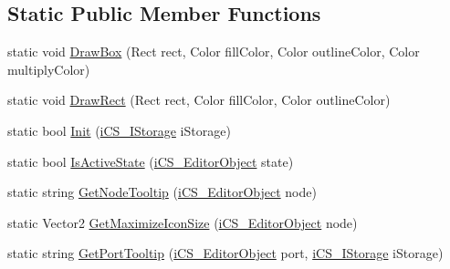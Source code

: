 \subsection*{Static Public Member Functions}
\begin{DoxyCompactItemize}
\item 
static void \hyperlink{classi_c_s___graphics_adc3ae4c2c48f361a59959bd2bf81a604}{Draw\+Box} (Rect rect, Color fill\+Color, Color outline\+Color, Color multiply\+Color)
\item 
static void \hyperlink{classi_c_s___graphics_a691d3ea8d4bfbca7bc6bc3f5eef1a66c}{Draw\+Rect} (Rect rect, Color fill\+Color, Color outline\+Color)
\item 
static bool \hyperlink{classi_c_s___graphics_a87c9c03e96791a61ce69958a7abff6f2}{Init} (\hyperlink{classi_c_s___i_storage}{i\+C\+S\+\_\+\+I\+Storage} i\+Storage)
\item 
static bool \hyperlink{classi_c_s___graphics_ad79270a927c0b998257c2476ebfac346}{Is\+Active\+State} (\hyperlink{classi_c_s___editor_object}{i\+C\+S\+\_\+\+Editor\+Object} state)
\item 
static string \hyperlink{classi_c_s___graphics_a49ee3ede903f1a790e4c24f33d2f58dc}{Get\+Node\+Tooltip} (\hyperlink{classi_c_s___editor_object}{i\+C\+S\+\_\+\+Editor\+Object} node)
\item 
static Vector2 \hyperlink{classi_c_s___graphics_a28eb25eee213fbd3bfcb82766bc1a074}{Get\+Maximize\+Icon\+Size} (\hyperlink{classi_c_s___editor_object}{i\+C\+S\+\_\+\+Editor\+Object} node)
\item 
static string \hyperlink{classi_c_s___graphics_a873d5a79d16165c2e885ea2a6d5c9262}{Get\+Port\+Tooltip} (\hyperlink{classi_c_s___editor_object}{i\+C\+S\+\_\+\+Editor\+Object} port, \hyperlink{classi_c_s___i_storage}{i\+C\+S\+\_\+\+I\+Storage} i\+Storage)
\end{DoxyCompactItemize}
